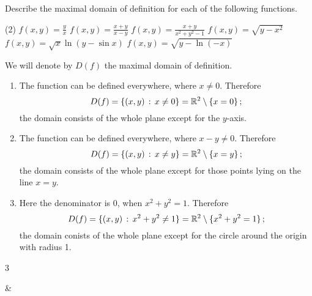 \begin{question}
Describe the maximal domain of definition for each of the following functions.
\begin{tasks}(2)
\task
$f(x,y) = \displaystyle\frac{y}{x}$
\task
$f(x,y) = \displaystyle\frac{x+y}{x-y}$
\task
$f(x,y) = \displaystyle\frac{x+y}{x^2+y^2-1}$
\task
$f(x,y) = \sqrt{y - x^2}$
\task
$f(x,y) = \sqrt{x} \ln (y-\sin x)$
\task
$f(x,y) = \sqrt{y - \ln(-x)}$
\end{tasks}
\end{question}

\begin{solution}
We will denote by $D(f)$ the maximal domain of definition.
\begin{enumerate}
\item
The function can be defined everywhere, where $x \neq 0$. Therefore
\[
D(f) = \{ (x,y)\,:\, x \neq 0 \} = {\mathbb R}^2 \setminus \{ x = 0 \} \,;
\]
the domain consists of the whole plane except for the $y$-axis.
\item
The function can be defined everywhere, where $x - y \neq 0$. Therefore
\[
D(f) = \{ (x,y) \,:\, x \neq y \} = {\mathbb R}^2 \setminus \{ x=y \} \,;
\]
the domain consists of the whole plane except for those points lying on the line $x=y$.
\item
Here the denominator is $0$, when $x^2 + y^2 = 1$. Therefore
\[
D(f) = \{ (x,y) \,:\, x^2 + y^2 \neq 1 \} = {\mathbb R}^2 \setminus \{ x^2 + y^2 = 1\} \,;
\]
the domain conists of the whole plane except for the circle around the origin with radius 1.
\end{enumerate}

\begin{center}
\begin{figuretable}{3}
&
\end{figuretable}
\end{center}
\end{solution}
